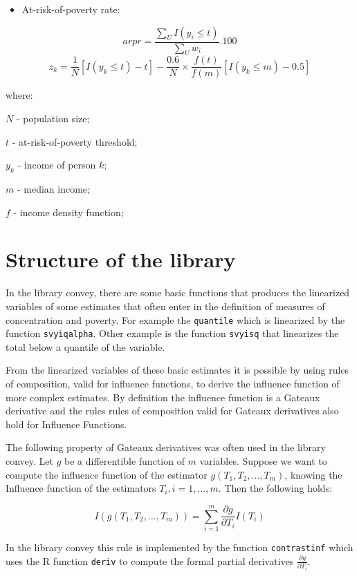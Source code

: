 \documentclass[]{book}
\providecommand{\tightlist}{%
  \setlength{\itemsep}{0pt}\setlength{\parskip}{0pt}}
\begin{document}
\begin{itemize}
\tightlist
\item
  At-risk-of-poverty rate:
\end{itemize}

\[
 arpr=\frac{\sum_U I(y_i \leq t)}{\sum_U w_i}.100
\] \[
z_k=\frac{1}{N}\left[I(y_k\leq t)-t\right]-\frac{0.6}{N}\times\frac{f(t)}{f(m)}\left[I(y_k\leq m)-0.5\right]
\]

where:

\(N\) - population size;

\(t\) - at-risk-of-poverty threshold;

\(y_k\) - income of person \(k\);

\(m\) - median income;

\(f\) - income density function;

\section{Structure of the library}\label{structure-of-the-library}

In the library convey, there are some basic functions that produces the
linearized variables of some estimates that often enter in the
definition of measures of concentration and poverty. For example the
\texttt{quantile} which is linearized by the function
\texttt{svyiqalpha}. Other example is the function \texttt{svyisq} that
linearizes the total below a quantile of the variable.

From the linearized variables of these basic estimates it is possible by
using rules of composition, valid for influence functions, to derive the
influence function of more complex estimates. By definition the
influence function is a Gateaux derivative and the rules rules of
composition valid for Gateaux derivatives also hold for Influence
Functions.

The following property of Gateaux derivatives was often used in the
library convey. Let \(g\) be a differentible function of \(m\)
variables. Suppose we want to compute the influence function of the
estimator \(g(T_1, T_2,\ldots, T_m)\), knowing the Influence function of
the estimators \(T_i, i=1,\ldots, m\). Then the following holds:

\[
I(g(T_1, T_2,\ldots, T_m)) = \sum_{i=1}^m \frac{\partial g}{\partial T_i}I(T_i)
\]

In the library convey this rule is implemented by the function
\texttt{contrastinf} which uses the R function \texttt{deriv} to compute
the formal partial derivatives \(\frac{\partial g}{\partial T_i}\).
\end{document}
